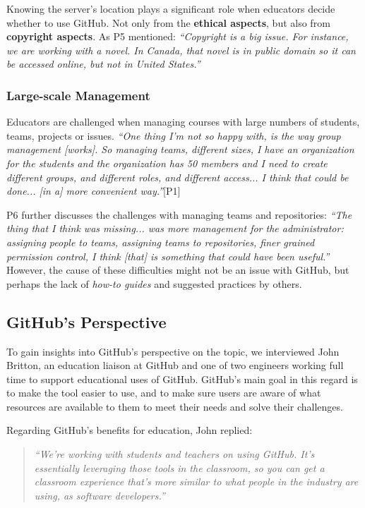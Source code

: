 Knowing the server's location plays a significant role when educators decide whether to use GitHub. Not only from the \textbf{ethical aspects}, but also from \textbf{copyright aspects}. As P5 mentioned: \textit{``Copyright is a big issue. For instance, we are working with a novel. In Canada, that novel is in public domain so it can be accessed online, but not in United States.''}

\subsubsection{Large-scale Management}
Educators are challenged when managing courses with large numbers of students, teams, projects or issues. \textit{``One thing I'm not so happy with, is the way group management [works]. So managing teams, different sizes, I have an organization for the students and the organization has 50 members and I need to create different groups, and different roles, and different access... I think that could be done... [in a] more convenient way.''}[P1]

P6 further discusses the challenges with managing teams and repositories: \textit{``The thing that I think was missing... was more management for the administrator: assigning people to teams, assigning teams to repositories, finer grained permission control, I think [that] is something that could have been useful.''} However, the cause of these difficulties might not be an issue with GitHub, but perhaps the lack of \textit{how-to guides} and suggested practices by others.

\subsection{GitHub's Perspective}
To gain insights into GitHub's perspective on the topic, we interviewed John Britton, an education liaison at GitHub and one of two engineers working full time to support educational uses of GitHub. GitHub's main goal in this regard is to make the tool easier to use, and to make sure users are aware of what resources are available to them to meet their needs and solve their challenges.

Regarding GitHub's benefits for education, John replied:
\begin{quote}\textit{``We're working with students and teachers on using GitHub. It's essentially leveraging those tools in the classroom, so you can get a classroom experience that's more similar to what people in the industry are using, as software developers.''}\end{quote}

